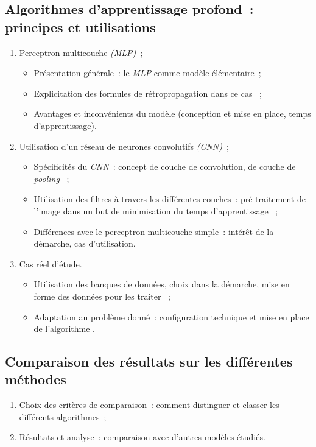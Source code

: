 \documentclass{article}
\begin{document}
  \subsection{Algorithmes d'apprentissage profond~: principes et utilisations}
    \begin{enumerate}
      \item Perceptron multicouche \textit{(MLP)}~;
        \begin{itemize}
          \item Présentation générale~: le \textit{MLP} comme modèle élémentaire~;
          \item Explicitation des formules de rétropropagation dans ce cas \cite{3B1B:2018}~;
          \item Avantages et inconvénients du modèle (conception et mise en place, temps d'apprentissage).
        \end{itemize}
      \item Utilisation d'un réseau de neurones convolutifs \textit{(CNN)}~;
        \begin{itemize}
          \item Spécificités du \textit{CNN}~: concept de couche de convolution, de couche de \textit{pooling} \cite{Rathi:2018}~;
          \item Utilisation des filtres à travers les différentes couches~: pré-traitement de l'image dans un but de minimisation du temps d'apprentissage \cite{Rathi:2018}~;
          \item Différences avec le perceptron multicouche simple~: intérêt de la démarche, cas d'utilisation.
        \end{itemize}
      \item Cas réel d'étude.
        \begin{itemize}
          \item Utilisation des banques de données, choix dans la démarche, mise en forme des données pour les traiter \cite{Rathi:2018}~;
          \item Adaptation au problème donné~: configuration technique et mise en place de l'algorithme \cite{TF}.
        \end{itemize}
    \end{enumerate}
  \subsection{Comparaison des résultats sur les différentes méthodes}
    \begin{enumerate}
      \item Choix des critères de comparaison~: comment distinguer et classer les différents algorithmes~;
      \item Résultats et analyse~: comparaison avec d'autres modèles étudiés.
    \end{enumerate}
\end{document}
